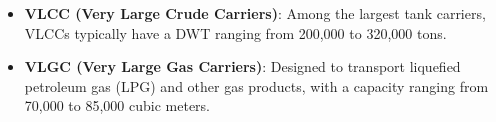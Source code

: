 \begin{itemize}
    \item \textbf{VLCC (Very Large Crude Carriers)}: Among the largest tank carriers, VLCCs typically have a DWT ranging from 200,000 to 320,000 tons.
    \item \textbf{VLGC (Very Large Gas Carriers)}: Designed to transport liquefied petroleum gas (LPG) and other gas products, with a capacity ranging from 70,000 to 85,000 cubic meters.
\end{itemize}